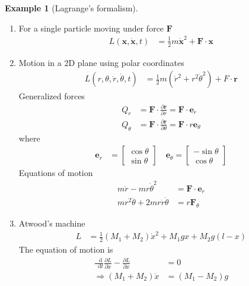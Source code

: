 \documentclass[twoside,9pt]{article}
\numberwithin{equation}{section} %
\newcommand{\lms}{\fontfamily{lmss}\selectfont} %
\renewcommand*\d{\mathop{}\!\mathrm{d}}
\theoremstyle{definition}
\newtheorem{example}{\lms Example}[section]
\theoremstyle{remark}
\begin{document}
\begin{example}[Lagrange's formalism]\
\begin{enumerate}[label=\arabic*)]
\item For a single particle moving under force $\mathbf{F}$
\begin{align*}
    L(\mathbf{x}, \dot{\mathbf{x}}, t) &= \frac{1}{2}m\dot{\mathbf{x}}^2 + \mathbf{F}\cdot\mathbf{x}
\end{align*}

\item Motion in a 2D plane using polar coordinates
\begin{align*}
    L(r, \theta, \dot{r}, \dot{\theta}, t) &= 
    \frac{1}{2}m(\dot{r}^2 + r^2\dot{\theta}^2)
    + F\cdot\mathbf{r}
\end{align*}
Generalized forces
\begin{align*}
    Q_r &= \mathbf{F}\cdot\frac{\partial\mathbf{r}}{\partial r}
    = \mathbf{F}\cdot\mathbf{e}_r\\
    Q_\theta &= \mathbf{F}\cdot\frac{\partial\mathbf{r}}{\partial\theta}
    = \mathbf{F}\cdot r\mathbf{e}_\theta
\end{align*}
where
\begin{align*}
    \mathbf{e}_r &= \begin{bmatrix}
        \cos\theta\\ \sin\theta
    \end{bmatrix}\quad
    \mathbf{e}_\theta = \begin{bmatrix}
        -\sin\theta\\ \cos\theta
    \end{bmatrix}
\end{align*}
Equations of motion
\begin{align*}
    m\ddot{r} - mr\dot{\theta}^2 &= \mathbf{F}\cdot\mathbf{e}_r\\
    mr^2\ddot{\theta} + 2mr\dot{r}\dot{\theta} &= r\mathbf{F}_\theta
\end{align*}

\item Atwood's machine
\begin{align*}
    L &= \frac{1}{2}(M_1+M_2)\dot{x}^2 + 
    M_1g x + M_2 g(l-x)
\end{align*}
The equation of motion is
\begin{align*}
    \frac{\d}{\d t}\frac{\partial L}{\partial \dot{x}}
    - \frac{\partial L}{\partial x} &= 0\\
    \Rightarrow (M_1 + M_2)\ddot{x} &= (M_1 - M_2)g
\end{align*}

\end{enumerate}
\end{example}
\end{document}
